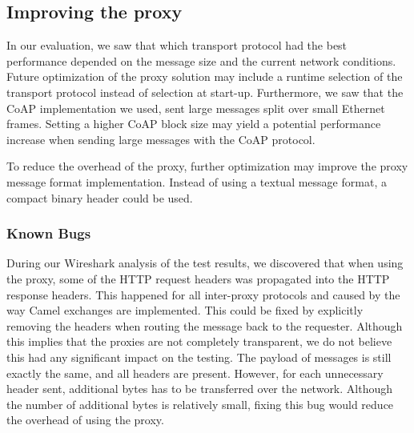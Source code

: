 \subsection{Improving the proxy}

In our evaluation, we saw that which transport protocol had the best performance
depended on the message size and the current network conditions. Future
optimization of the proxy solution may include a runtime selection of
the transport protocol instead of selection at start-up. Furthermore, we saw
that the CoAP implementation we used, sent large messages split over small
Ethernet frames. Setting a higher CoAP block size may yield a potential
performance increase when sending large messages with the CoAP protocol.

To reduce the overhead of the proxy, further optimization may improve the proxy
message format implementation. Instead of using a textual message format, a
compact binary header could be used.

\subsubsection{Known Bugs}

During our Wireshark analysis of the test results, we discovered that when using
the proxy, some of the HTTP request headers was propagated into the HTTP
response headers. This happened for all inter-proxy protocols and caused by the
way Camel exchanges are implemented. This could be fixed by explicitly removing
the headers when routing the message back to the requester. Although this
implies that the proxies are not completely transparent, we do not believe this
had any significant impact on the testing. The payload of messages is still
exactly the same, and all headers are present. However, for each unnecessary
header sent, additional bytes has to be transferred over the network. Although
the number of additional bytes is relatively small, fixing this bug would reduce
the overhead of using the proxy.
